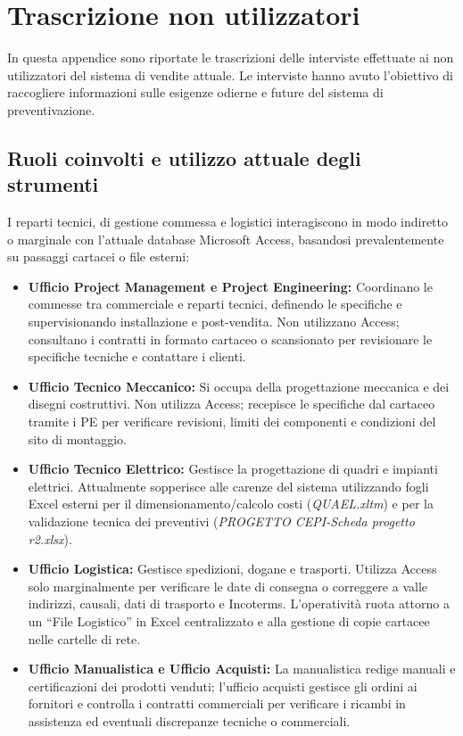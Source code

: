 \chapter{Trascrizione non utilizzatori}\label{app:risultati-interviste-non-utilizzatori}
In questa appendice sono riportate le trascrizioni delle interviste effettuate
ai non utilizzatori del sistema di vendite attuale.
Le interviste hanno avuto l'obiettivo di raccogliere informazioni sulle esigenze odierne
e future del sistema di preventivazione.
\section{Ruoli coinvolti e utilizzo attuale degli strumenti}
I reparti tecnici, di gestione commessa e logistici interagiscono in modo indiretto
o marginale con l'attuale database Microsoft Access, basandosi prevalentemente su passaggi cartacei o file esterni:
\begin{itemize}
      \item \textbf{Ufficio Project Management e Project Engineering:} Coordinano le commesse tra commerciale
            e reparti tecnici, definendo le specifiche e supervisionando installazione e post-vendita.
            Non utilizzano Access; consultano i contratti in formato cartaceo o scansionato per revisionare le
            specifiche tecniche e contattare i clienti.
      \item \textbf{Ufficio Tecnico Meccanico:} Si occupa della progettazione meccanica e dei disegni costruttivi.
            Non utilizza Access; recepisce le specifiche dal cartaceo tramite i \ac{PE} per verificare revisioni,
            limiti dei componenti e condizioni del sito di montaggio.
      \item \textbf{Ufficio Tecnico Elettrico:} Gestisce la progettazione di quadri e impianti elettrici.
            Attualmente sopperisce alle carenze del sistema utilizzando fogli Excel esterni
            per il dimensionamento/calcolo costi
            (\textit{QUAEL.xltm}) e per la validazione tecnica dei preventivi (\textit{PROGETTO CEPI-Scheda progetto r2.xlsx}).
      \item \textbf{Ufficio Logistica:} Gestisce spedizioni, dogane e trasporti. Utilizza Access solo marginalmente
            per verificare
            le date di consegna o correggere a valle indirizzi, causali, dati di trasporto e Incoterms.
            L'operatività ruota attorno
            a un
            ``File Logistico'' in Excel centralizzato e alla gestione di copie cartacee nelle cartelle di rete.
      \item \textbf{Ufficio Manualistica e Ufficio Acquisti:} La manualistica redige manuali e certificazioni dei prodotti venduti;
            l'ufficio acquisti gestisce gli ordini ai fornitori e controlla i contratti commerciali per verificare i ricambi in
            assistenza ed eventuali discrepanze tecniche o commerciali.
\end{itemize}

